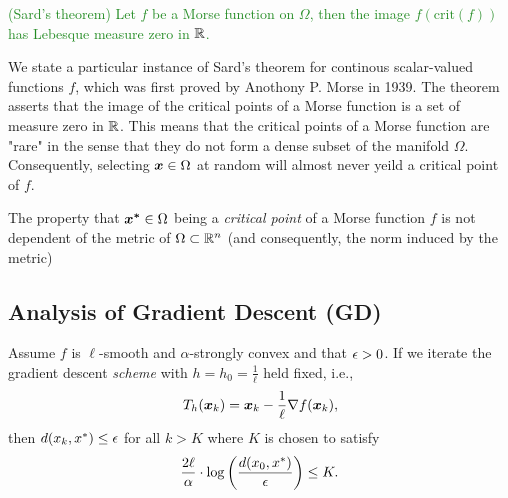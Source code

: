 \documentclass[11pt]{article}
\begin{document}
    \begin{theorem}
        \textcolor{ForestGreen}{
            (Sard's theorem) Let $f$ be a Morse function on $\Omega$, then
            the image $f(\text{crit}(f))$ has Lebesque measure zero in $\mathbb{R}$.
        }
    \end{theorem}

    \begin{remark}
        We state a particular instance of Sard's theorem for continous scalar-valued functions $f$,
        which was first proved by Anothony P. Morse in 1939.
        The theorem asserts that the image of the critical points of a Morse function is a set 
        of measure zero in $\mathbb{R}$. This means that the critical points of a Morse function are "rare" in the sense that they
        do not form a dense subset of the manifold $\Omega$.
        Consequently, selecting $\bm{x} \in \Omega$ at random will almost never yeild a critical
        point of $f$.
    \end{remark}

    \begin{remark}
        The property that $\bm{x^*} \in \Omega$ being a \emph{critical point} of a Morse function $f$ is
        not dependent of the metric of $\Omega \subset \mathbb{R}^n$ (and consequently, the norm induced by the metric)
    \end{remark}



    \subsection{Analysis of Gradient Descent (GD)}

        \begin{theorem} Assume $f$ is $\ell$-smooth and $\alpha$-strongly convex and that $\epsilon > 0$.
            If we iterate the gradient descent \emph{scheme} with $h = h_0 = \frac{1}{\ell}$ held fixed, i.e.,
            $$
                T_{h}(\bm{x}_k) = \bm{x}_k - \frac{1}{\ell} \nabla f(\bm{x}_k),
            $$
            then $d(x_k, x^*) \leq \epsilon$ for all $k > K$ where $K$ is chosen to satisfy
            $$
                \frac{2\ell}{\alpha} \cdot \log\left(\frac{d(x_0, x^*)}{\epsilon}\right) \leq K.
            $$
        \end{theorem}
\end{document}
